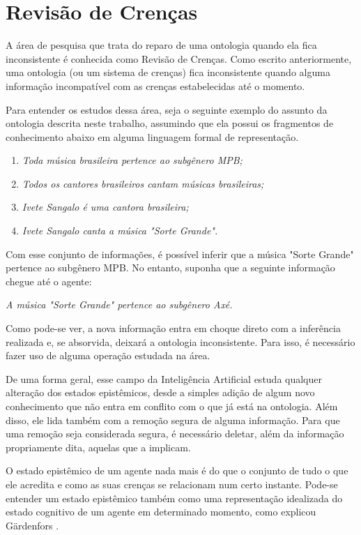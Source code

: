 \chapter{Revisão de Crenças}
\label{chap:revisao}

\lettrine{A}{} área de pesquisa que trata do reparo de uma ontologia quando ela fica inconsistente é conhecida como Revisão de Crenças. Como escrito anteriormente, uma ontologia (ou um sistema de crenças) fica inconsistente quando alguma informação incompatível com as crenças estabelecidas até o momento.

Para entender os estudos dessa área, seja o seguinte exemplo do assunto da ontologia descrita neste trabalho, assumindo que ela possui os fragmentos de conhecimento abaixo em alguma linguagem formal de representação.

\begin{enumerate}
	\item \textit{Toda música brasileira pertence ao subgênero MPB;}
	\item \textit{Todos os cantores brasileiros cantam músicas brasileiras;}
	\item \textit{Ivete Sangalo é uma cantora brasileira;}
	\item \textit{Ivete Sangalo canta a música "Sorte Grande".}
\end{enumerate}

Com esse conjunto de informações, é possível inferir que a música "Sorte Grande" pertence ao subgênero MPB. No entanto, suponha que a seguinte informação chegue até o agente:

\begin{center}
	\textit{A música "Sorte Grande" pertence ao subgênero Axé.}
\end{center}

Como pode-se ver, a nova informação entra em choque direto com a inferência realizada e, se absorvida, deixará a ontologia inconsistente. Para isso, é necessário fazer uso de alguma operação estudada na área.

De uma forma geral, esse campo da Inteligência Artificial estuda qualquer alteração dos estados epistêmicos, desde a simples adição de algum novo conhecimento que não entra em conflito com o que já está na ontologia. Além disso, ele lida também com a remoção segura de alguma informação. Para que uma remoção seja considerada segura, é necessário deletar, além da informação propriamente dita, aquelas que a implicam. 

O estado epistêmico de um agente nada mais é do que o conjunto de tudo o que ele acredita e como as suas crenças se relacionam num certo instante. Pode-se entender um estado epistêmico também como uma representação idealizada do estado cognitivo de um agente em determinado momento, como explicou Gärdenfors \cite{revisaoGardenfors}.


